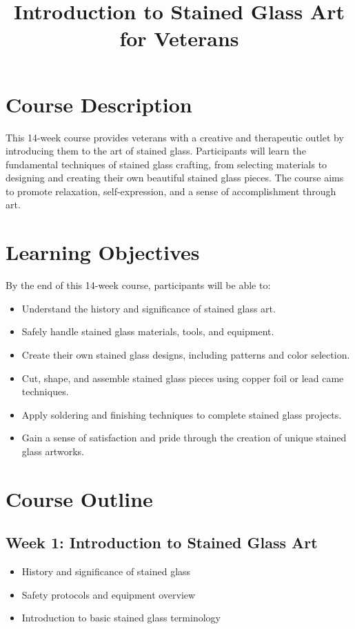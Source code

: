\documentclass[11pt]{article}
\title{Introduction to Stained Glass Art for Veterans}
\date{}
\begin{document}
    \maketitle

    \section*{Course Description}
    This 14-week course provides veterans with a creative and therapeutic outlet by introducing them to the art of stained glass. Participants will learn the fundamental techniques of stained glass crafting, from selecting materials to designing and creating their own beautiful stained glass pieces. The course aims to promote relaxation, self-expression, and a sense of accomplishment through art.

    \section*{Learning Objectives}
    By the end of this 14-week course, participants will be able to:
    \begin{itemize}
        \item     Understand the history and significance of stained glass art.
        \item     Safely handle stained glass materials, tools, and equipment.
        \item     Create their own stained glass designs, including patterns and color selection.
        \item     Cut, shape, and assemble stained glass pieces using copper foil or lead came techniques.
        \item     Apply soldering and finishing techniques to complete stained glass projects.
        \item     Gain a sense of satisfaction and pride through the creation of unique stained glass artworks.
    \end{itemize}

    \section*{Course Outline}
    \subsection*{Week 1: Introduction to Stained Glass Art}
    \begin{itemize}
        \item History and significance of stained glass
        \item Safety protocols and equipment overview
        \item Introduction to basic stained glass terminology
\end{itemize}
\end{document}

